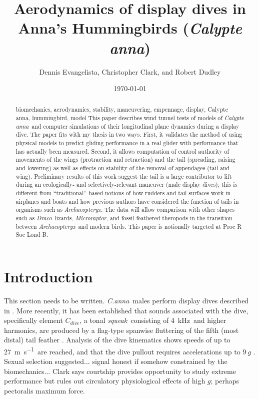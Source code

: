 \documentclass{rspublic}
\newcommand{\Calypteanna}{\emph{Calypte anna}}
\newcommand{\Canna}{\emph{C.\:anna}}
\newcommand{\Archaeopteryx}{\emph{Archaeopteryx}}
\newcommand{\Microraptor}{\emph{Microraptor}}
\newcommand{\Draco}{\emph{Draco}}
\begin{document}
\title[Anna's Hummingbird dive aerodynamics]{Aerodynamics of display dives in Anna's Hummingbirds (\Calypteanna)}
\author[D. Evangelista, C. Clark and R. Dudley]{Dennis Evangelista, Christopher Clark, and Robert Dudley}
\date{\today}
\label{firstpage}
\maketitle


\begin{abstract}{biomechanics, aerodynamics, stability, maneuvering, empennage, display, Calypte anna, hummingbird, model}
This paper describes wind tunnel tests of models of \Calypteanna\ and computer simulations of their longitudinal plane dynamics during a display dive.  The paper fits with my thesis in two ways.  First, it validates the method of using physical models to predict gliding performance in a real glider with performance that has actually been measured.  Second, it allows computation of control authority of movements of the wings (protraction and retraction) and the tail (spreading, raising and lowering) as well as effects on stability of the removal of appendages (tail and wing).  Preliminary results of this work suggest the tail is a large contributor to lift during an ecologically- and selectively-relevant maneuver (male display dives); this is different from ``traditional'' based notions of how rudders and tail surfaces work in airplanes and boats and how previous authors have considered the function of tails in organisms such as \Archaeopteryx.  The data will allow comparison with other shapes such as \Draco\ lizards, \Microraptor, and fossil feathered theropods in the transition between \Archaeopteryx\ and modern birds.   This paper is notionally targeted at Proc R Soc Lond B. 
\end{abstract}




\section{Introduction}
This section needs to be written.  \Canna\ males perform display dives described in \citep{Hamilton:1965,Stiles:1982}.   More recently, it has been established that sounds associated with the dive, specifically element $C_{dive}$, a tonal \emph{squeak}\ consisting of \SI{4}{\kilo\hertz}\ and higher harmonics, are produced by a flag-type spanwise fluttering of the fifth (most distal) tail feather \citep{Clark:2008}. Analysis of the dive kinematics shows speeds of up to \SI{27}{\meter\per\second}\ are reached, and that the dive pullout requires accelerations up to $\num{9}\ g$ \citep{Clark:2009}.  Sexual selection suggested... signal honest if somehow constrained by the biomechanics... Clark says courtship provides opportunity to study extreme performance but rules out circulatory physiological effects of high $g$; perhaps pectoralis maximum force.  
\end{document}
